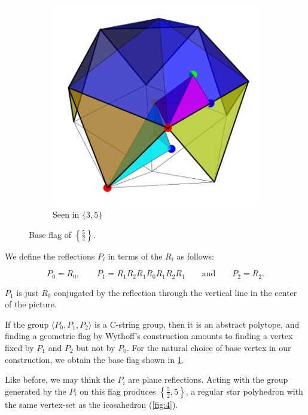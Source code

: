 \documentclass{article}
\theoremstyle{definition}
\begin{document}
\begin{figure}[H]
\begin{center}
\begin{subfigure}{0.4\linewidth}
				\includegraphics[width=\linewidth]{fig3b}
				\caption{Seen in $\{3,5\}$}\label{fig:3b}
			\end{subfigure}
		\end{center}
		\caption{Base flag of $\left\{\frac{5}{2}\right\}$.}\label{fig:3}
	\end{figure}
	
	We define the reflections $P_i$ in terms of the $R_i$ as follows:
	
	\[P_0=R_0,\qquad P_1=R_1R_2R_1R_0R_1R_2R_1\qquad\text{and}\qquad P_2=R_2.\]
	
	$P_1$ is just $R_0$ conjugated by the reflection through the vertical line in the center of the picture.
	
	If the group $\langle P_0,P_1,P_2\rangle$ is a C-string group, then it is an abstract polytope, and finding a geometric flag by Wythoff's construction amounts to finding a vertex fixed by $P_1$ and $P_2$ but not by $P_0$. For the natural choice of base vertex in our construction, we obtain the base flag shown in \cref{fig:3b}.
	
	Like before, we may think the $P_i$ are plane reflections. Acting with the group generated by the $P_i$ on this flag produces $\left\{\frac{5}{2},5\right\}$, a regular star polyhedron with the same vertex-set as the icosahedron (\cref{fig:4}).
	
\end{document}
